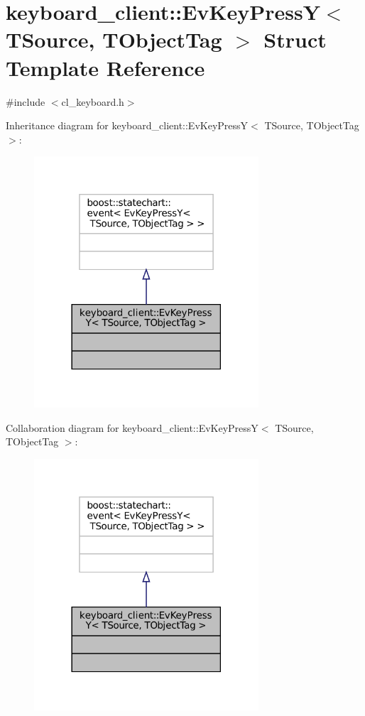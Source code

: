 \hypertarget{structkeyboard__client_1_1EvKeyPressY}{}\section{keyboard\+\_\+client\+:\+:Ev\+Key\+PressY$<$ T\+Source, T\+Object\+Tag $>$ Struct Template Reference}
\label{structkeyboard__client_1_1EvKeyPressY}


{\ttfamily \#include $<$cl\+\_\+keyboard.\+h$>$}



Inheritance diagram for keyboard\+\_\+client\+:\+:Ev\+Key\+PressY$<$ T\+Source, T\+Object\+Tag $>$\+:
\nopagebreak
\begin{figure}[H]
\begin{center}
\leavevmode
\includegraphics[width=237pt]{structkeyboard__client_1_1EvKeyPressY__inherit__graph}
\end{center}
\end{figure}


Collaboration diagram for keyboard\+\_\+client\+:\+:Ev\+Key\+PressY$<$ T\+Source, T\+Object\+Tag $>$\+:
\nopagebreak
\begin{figure}[H]
\begin{center}
\leavevmode
\includegraphics[width=237pt]{structkeyboard__client_1_1EvKeyPressY__coll__graph}
\end{center}
\end{figure}


